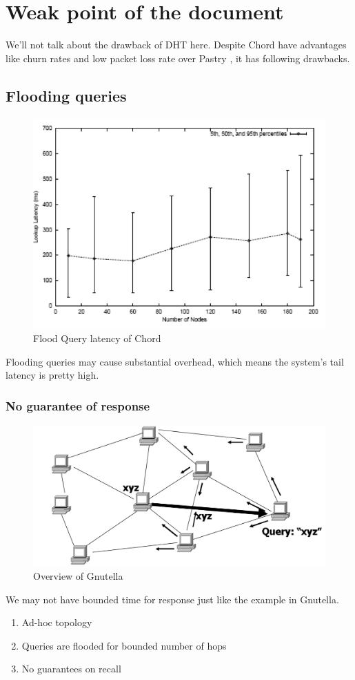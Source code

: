 \documentclass[acmlarge]{acmart}
\begin{document}
\section{Weak point of the document}

We'll not talk about the drawback of DHT here. Despite Chord have advantages like churn rates and low packet loss rate over Pastry \cite{rowstron2001pastry}, it has following drawbacks.
\subsection{Flooding queries}
\begin{figure}[htbp]
  \centering
  \includegraphics[width=0.3\columnwidth]{./flood.png}
  \caption{Flood Query latency of Chord \cite{lua2005survey}}
\end{figure}

Flooding queries may cause substantial overhead, which means the system's tail latency is pretty high.
\subsubsection{No guarantee of response}
\begin{figure}[htbp]
  \centering
  \includegraphics[width=\columnwidth]{./gnutella.png}
  \caption{Overview of Gnutella \cite{cmu}}
\end{figure}

We may not have bounded time for response just like the example in Gnutella.
\begin{enumerate}
  \item Ad-hoc topology
  \item Queries are flooded for bounded number of hops
  \item No guarantees on recall
\end{enumerate}
\end{document}
